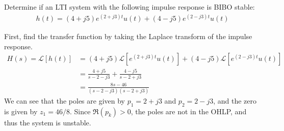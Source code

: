 \documentclass{report}
\begin{document}
\begin{example}
    Determine if an LTI system with the following impulse response is BIBO stable:
    \begin{align*}
        h(t)=(4+j5)e^{(2+j3)t}u(t)+(4-j5)e^{(2-j3)t}u(t)
    \end{align*}
\end{example}
\begin{solution}
    First, find the transfer function by taking the Laplace transform of the impulse response.
    \begin{align*}
        H(s) = \mathcal{L}[h(t)] &= (4+j5)\mathcal{L}[e^{(2+j3)t}u(t)]+(4-j5)\mathcal{L}[e^{(2-j3)t}u(t)] \\
        &= \frac{4+j5}{s-2-j3} + \frac{4-j5}{s-2+j3} \\
        &= \frac{8s-46}{(s-2-j3)(s-2+j3)}
    \end{align*}
    We can see that the poles are given by $p_1=2+j3$ and $p_2=2-j3$, and the zero is given by $z_1=46/8$. 
    Since $\Re(p_k)>0$, the poles are not in the OHLP, and thus the system is unstable. \\
\end{solution}
\end{document}
